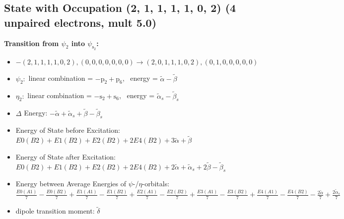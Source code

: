 \documentclass[12pt,a4paper]{article}
\begin{document}
\subsection*{State with Occupation (2, 1, 1, 1, 1, 0, 2) (4 unpaired electrons, mult 5.0)}
        \noindent\textbf{Transition from $\psi_{2}$ into $\psi_{\text{s}_{2}}$:}
        \begin{itemize}
            \item $- (2, 1, 1, 1, 1, 0, 2), (0, 0, 0, 0, 0, 0, 0) \rightarrow (2, 0, 1, 1, 1, 0, 2), (0, 1, 0, 0, 0, 0, 0)$
        
            \item $\psi_{2}:$ linear combination = $- \text{p}_{2} + \text{p}_{6}$, \
            energy = $\tilde{\alpha} - \tilde{\beta}$
            
            \item $\eta_{2}:$ linear combination = $- \text{s}_{2} + \text{s}_{6}$, \
            energy = $\tilde{\alpha}_{s} - \tilde{\beta}_{s}$
            
                \item $\Delta$ Energy: $- \tilde{\alpha} + \tilde{\alpha}_{s} + \tilde{\beta} - \tilde{\beta}_{s}$
                \item Energy of State before Excitation: $E0(B2) + E1(B2) + E2(B2) + 2 E4(B2) + 3 \tilde{\alpha} + \tilde{\beta}$
                \item Energy of State after Excitation: $E0(B2) + E1(B2) + E2(B2) + 2 E4(B2) + 2 \tilde{\alpha} + \tilde{\alpha}_{s} + 2 \tilde{\beta} - \tilde{\beta}_{s}$
                \item Energy between Average Energies of $\psi$-/$\eta$-orbitals: $\frac{E0(A1)}{7} - \frac{E0(B2)}{7} + \frac{E1(A1)}{7} - \frac{E1(B2)}{7} + \frac{E2(A1)}{7} - \frac{E2(B2)}{7} + \frac{E3(A1)}{7} - \frac{E3(B2)}{7} + \frac{E4(A1)}{7} - \frac{E4(B2)}{7} - \frac{2 \tilde{\alpha}}{7} + \frac{2 \tilde{\alpha}_{s}}{7}$
            
            \item dipole transition moment: $\tilde{\delta}$
        
        \end{itemize}
        
\end{document}
